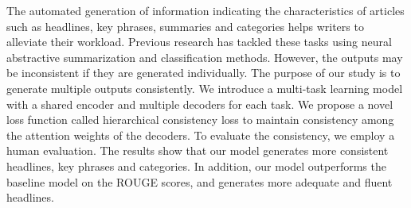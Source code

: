 The automated generation of information indicating the characteristics of articles such as headlines, key phrases, summaries and categories helps writers to alleviate their workload.
Previous research has tackled these tasks using neural abstractive summarization and classification methods.
However, the outputs may be inconsistent if they are generated individually.
The purpose of our study is to generate multiple outputs consistently.
We introduce a multi-task learning model with a shared encoder and multiple decoders for each task.
We propose a novel loss function called hierarchical consistency loss to maintain consistency among the attention weights of the decoders.
To evaluate the consistency, we employ a human evaluation.
The results show that our model generates more consistent headlines, key phrases and categories.
In addition, our model outperforms the baseline model on the ROUGE scores, and generates more adequate and fluent headlines.